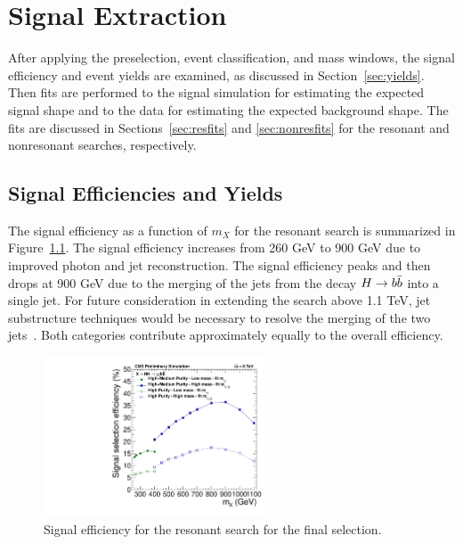 \chapter{Signal Extraction\label{ch:signalextraction}}

After applying the preselection, event classification, and mass windows, the signal efficiency
and event yields are examined, as discussed in Section~\ref{sec:yields}. Then fits are performed
to the signal simulation for estimating the expected signal shape and to the data for estimating
the expected background shape. The fits are discussed in Sections~\ref{sec:resfits} and
\ref{sec:nonresfits} for the resonant and nonresonant searches, respectively.

\section{Signal Efficiencies and Yields\label{sec:yields}}

The signal efficiency as a function of $m_X$ for the resonant search is summarized in
Figure~\ref{fig:eff_res}. The signal efficiency increases from 260 GeV to 900 GeV
due to improved photon and jet reconstruction. The signal efficiency
peaks and then drops at 900 GeV due to the merging of the jets from the decay $H\to b\bar{b}$ into
a single jet. For future consideration in extending the search above 1.1 TeV,
jet substructure techniques would be necessary to resolve the merging of the two
jets~\cite{Ellis:2009su}.
Both categories contribute approximately equally to the overall efficiency.

\begin{figure}[htbp!]
 \begin{center}
    \includegraphics[width=0.60\textwidth]{figures/results/eff_all.pdf}
      \end{center}
\caption{Signal efficiency for the resonant search for the final selection.}
\label{fig:eff_res}
\end{figure}

